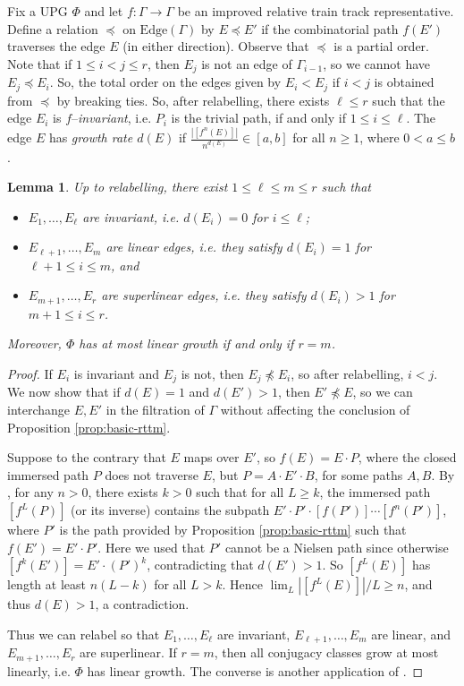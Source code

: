 \documentclass[11pt,oneside]{amsart}
\newtheorem{lem}[thm]{Lemma}
\theoremstyle{definition}
\newcommand{\edges}{\mathrm{Edge}}
\begin{document}
Fix a UPG $\Phi$ and let $f:\Gamma\to\Gamma$ be an 
improved relative train track representative.  Define a relation $\preceq$ on 
$\edges(\Gamma)$ by $E\preceq E'$ if the combinatorial path $f(E')$ traverses 
the edge $E$ (in either direction).  Observe that $\preceq$ is a partial 
order.  Note that if $1\leq i<j\leq r$, then $E_j$ is not an edge of $\Gamma_{i-1}$, 
so we cannot have $E_j\preceq E_i$.  So, the total order on the edges given by 
$E_i<E_j$ if $i<j$ is obtained from $\preceq$ by breaking ties.  So, after relabelling, there exists $\ell\leq r$ such that the 
edge $E_i$ is $f$--\emph{invariant}, i.e. $P_i$ is the trivial path, if and 
only if $1\leq i\leq \ell$.  The edge $E$ has \emph{growth rate $d(E)$} if $\frac{|[f^n(E)]|}{n^{d(E)}}\in[a,b]$ for all $n\geq 1$, where 
$0<a\leq b$. 

\begin{lem}\label{lem:stratify-linear-superlinear}
Up to relabelling, there exist $1\leq \ell\leq m\leq r$ such that
\begin{itemize}
 \item $E_1,\ldots,E_\ell$ are 
invariant, i.e. $d(E_i)=0$ for $i\leq\ell$;
\item $E_{\ell+1},\ldots,E_m$ are \emph{linear edges}, i.e. 
they satisfy $d(E_i)=1$ for $\ell+1\leq i\leq m$, and
\item $E_{m+1},\ldots,E_r$ are \emph{superlinear 
edges}, i.e. they satisfy $d(E_i)>1$ for $m+1\leq i\leq r$.
\end{itemize}
Moreover, $\Phi$ has at most linear growth if and only if $r=m$.
\end{lem}


\begin{proof}
If $E_i$ is invariant and $E_j$ is not, then 
$E_j\not\preceq E_i$, so after relabelling, $i<j$.  We now show that if 
$d(E)=1$ and $d(E')>1$, then $E'\not\preceq E$, so we can interchange $E,E'$ in the filtration of $\Gamma$ without affecting the conclusion of Proposition \ref{prop:basic-rttm}.  

Suppose to the contrary that $E$ maps over $E'$, so $f(E)=E\cdot P$, where the 
closed immersed path $P$ does not traverse $E$, but $P=A\cdot E'\cdot B$, for 
some paths $A,B$. 
By \cite[Prop. 4.10]{BFH:kolchin}, for any $n>0$, there exists 
$k>0$ such that for all $L\geq k$, the immersed path $[f^L(P)]$ (or its 
inverse) contains the subpath $E'\cdot P'\cdot[f(P')]\cdots[f^n(P')]$, where 
$P'$ is the path provided by Proposition \ref{prop:basic-rttm} such that 
$f(E')=E'\cdot P'$.  Here we used that $P'$ cannot be a Nielsen path since otherwise $[f^k(E')]=E'\cdot (P')^k$, 
contradicting that $d(E')>1$.  So $[f^L(E)]$ has length at least $n(L-k)$ for 
all $L>k$.  Hence $\lim_L|[f^L(E)]|/L\geq n$, and thus $d(E)>1$, a contradiction.

Thus we can relabel so that $E_1,\ldots,E_\ell$ are invariant, 
$E_{\ell+1},\ldots,E_m$ are linear, and $E_{m+1},\ldots,E_r$ are superlinear.  If $r=m$, then all conjugacy classes grow 
at most linearly, i.e. $\Phi$ has linear growth.  The converse is 
another application of \cite[Prop. 4.10]{BFH:kolchin}.
\end{proof}
\end{document}

